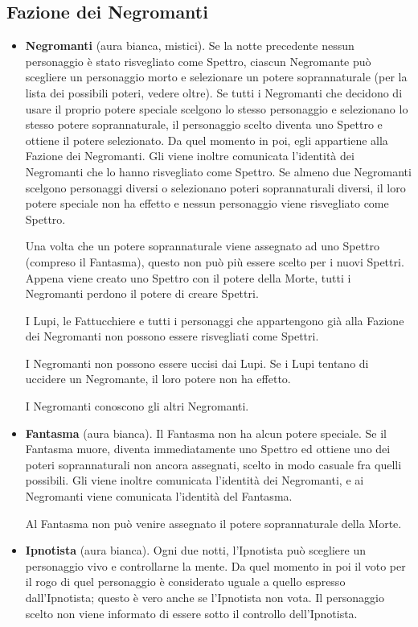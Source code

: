 \documentclass[a4paper,10pt]{article}
\begin{document}
\subsection*{Fazione dei Negromanti}
\label{spettri}
\begin{itemize}

 \item {\bf Negromanti} (aura bianca, mistici).
 Se la notte precedente nessun personaggio è stato risvegliato come Spettro,
ciascun Negromante può scegliere un personaggio morto e selezionare un potere
soprannaturale (per la lista dei possibili poteri, vedere oltre).
 Se tutti i Negromanti che decidono di usare il proprio potere speciale scelgono
lo stesso personaggio e selezionano lo stesso potere soprannaturale, il
personaggio scelto diventa uno Spettro e ottiene il potere selezionato.
 Da quel momento in poi, egli appartiene alla Fazione dei Negromanti. Gli viene
inoltre comunicata l'identità dei Negromanti che lo hanno risvegliato come
Spettro.
 Se almeno due Negromanti scelgono personaggi diversi o selezionano poteri
soprannaturali diversi, il loro potere speciale non ha effetto e nessun
personaggio viene risvegliato come Spettro.
 
 Una volta che un potere soprannaturale viene assegnato ad uno Spettro (compreso
il Fantasma), questo non può più essere scelto per i nuovi Spettri. Appena viene
creato uno Spettro con il potere della Morte, tutti i Negromanti perdono il
potere di creare Spettri.
 
 I Lupi, le Fattucchiere e tutti i personaggi che appartengono già alla Fazione
dei Negromanti non possono essere risvegliati come Spettri.

 I Negromanti non possono essere uccisi dai Lupi. Se i Lupi tentano di uccidere
un Negromante, il loro potere non ha effetto.

 I Negromanti conoscono gli altri Negromanti.
 
 \item {\bf Fantasma} (aura bianca). Il Fantasma non ha alcun potere speciale.
Se il Fantasma muore, diventa immediatamente uno Spettro ed ottiene uno dei
poteri soprannaturali non ancora assegnati, scelto in modo casuale fra quelli
possibili. Gli viene inoltre comunicata l'identità dei Negromanti, e ai
Negromanti viene comunicata l'identità del Fantasma.
 
 Al Fantasma non può venire assegnato il potere soprannaturale della Morte.
 
 \item {\bf Ipnotista} (aura bianca). Ogni due notti, l'Ipnotista può scegliere
un personaggio vivo e controllarne la mente.
 Da quel momento in poi il voto per il rogo di quel personaggio è considerato
uguale a quello espresso dall'Ipnotista; questo è vero anche se l'Ipnotista non
vota.
 Il personaggio scelto non viene informato di essere sotto il controllo
dell'Ipnotista.
 

\end{itemize}
\end{document}

